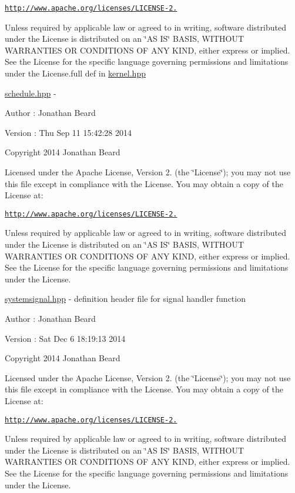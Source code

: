 \href{http://www.apache.org/licenses/LICENSE-2.0}{\tt http\+://www.\+apache.\+org/licenses/\+L\+I\+C\+E\+N\+S\+E-\/2.}

Unless required by applicable law or agreed to in writing, software distributed under the License is distributed on an \char`\"{}\+A\+S I\+S\char`\"{} B\+A\+S\+I\+S, W\+I\+T\+H\+O\+U\+T W\+A\+R\+R\+A\+N\+T\+I\+E\+S O\+R C\+O\+N\+D\+I\+T\+I\+O\+N\+S O\+F A\+N\+Y K\+I\+N\+D, either express or implied. See the License for the specific language governing permissions and limitations under the License.\+full def in \hyperlink{kernel_8hpp_source}{kernel.\+hpp}

\hyperlink{schedule_8hpp_source}{schedule.\+hpp} -\/ \begin{DoxyAuthor}{Author}
\+: Jonathan Beard 
\end{DoxyAuthor}
\begin{DoxyVersion}{Version}
\+: Thu Sep 11 15\+:42\+:28 2014
\end{DoxyVersion}
Copyright 2014 Jonathan Beard

Licensed under the Apache License, Version 2. (the \char`\"{}\+License\char`\"{}); you may not use this file except in compliance with the License. You may obtain a copy of the License at\+:

\href{http://www.apache.org/licenses/LICENSE-2.0}{\tt http\+://www.\+apache.\+org/licenses/\+L\+I\+C\+E\+N\+S\+E-\/2.}

Unless required by applicable law or agreed to in writing, software distributed under the License is distributed on an \char`\"{}\+A\+S I\+S\char`\"{} B\+A\+S\+I\+S, W\+I\+T\+H\+O\+U\+T W\+A\+R\+R\+A\+N\+T\+I\+E\+S O\+R C\+O\+N\+D\+I\+T\+I\+O\+N\+S O\+F A\+N\+Y K\+I\+N\+D, either express or implied. See the License for the specific language governing permissions and limitations under the License.

\hyperlink{systemsignal_8hpp_source}{systemsignal.\+hpp} -\/ definition header file for signal handler function

\begin{DoxyAuthor}{Author}
\+: Jonathan Beard 
\end{DoxyAuthor}
\begin{DoxyVersion}{Version}
\+: Sat Dec 6 18\+:19\+:13 2014
\end{DoxyVersion}
Copyright 2014 Jonathan Beard

Licensed under the Apache License, Version 2. (the \char`\"{}\+License\char`\"{}); you may not use this file except in compliance with the License. You may obtain a copy of the License at\+:

\href{http://www.apache.org/licenses/LICENSE-2.0}{\tt http\+://www.\+apache.\+org/licenses/\+L\+I\+C\+E\+N\+S\+E-\/2.}

Unless required by applicable law or agreed to in writing, software distributed under the License is distributed on an \char`\"{}\+A\+S I\+S\char`\"{} B\+A\+S\+I\+S, W\+I\+T\+H\+O\+U\+T W\+A\+R\+R\+A\+N\+T\+I\+E\+S O\+R C\+O\+N\+D\+I\+T\+I\+O\+N\+S O\+F A\+N\+Y K\+I\+N\+D, either express or implied. See the License for the specific language governing permissions and limitations under the License. 